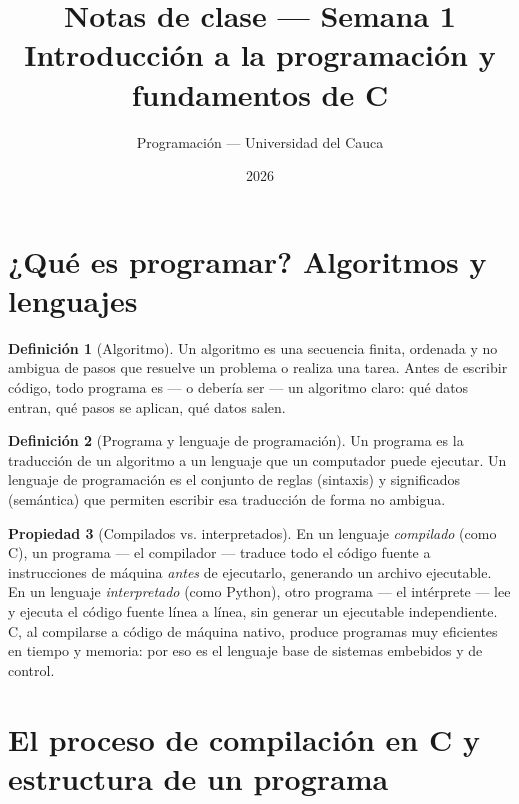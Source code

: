 \documentclass[11pt,letterpaper]{article}
\title{\textcolor{unicaucaverde}{\Large Notas de clase --- Semana 1}\\[4pt]
  \large Introducción a la programación y fundamentos de C}
\author{Programación --- Universidad del Cauca}
\date{2026}
\theoremstyle{definition}
\newtheorem{definicion}{Definición}[section]
\newtheorem{propiedad}[definicion]{Propiedad}
\begin{document}
\maketitle
\tableofcontents

\section{¿Qué es programar? Algoritmos y lenguajes}

\begin{definicion}[Algoritmo]
Un algoritmo es una secuencia finita, ordenada y no ambigua de pasos que resuelve un problema o
realiza una tarea. Antes de escribir código, todo programa es --- o debería ser --- un algoritmo
claro: qué datos entran, qué pasos se aplican, qué datos salen.
\end{definicion}

\begin{definicion}[Programa y lenguaje de programación]
Un programa es la traducción de un algoritmo a un lenguaje que un computador puede ejecutar. Un
lenguaje de programación es el conjunto de reglas (sintaxis) y significados (semántica) que
permiten escribir esa traducción de forma no ambigua.
\end{definicion}

\begin{propiedad}[Compilados vs. interpretados]
En un lenguaje \emph{compilado} (como C), un programa --- el compilador --- traduce todo el código
fuente a instrucciones de máquina \emph{antes} de ejecutarlo, generando un archivo ejecutable. En
un lenguaje \emph{interpretado} (como Python), otro programa --- el intérprete --- lee y ejecuta el
código fuente línea a línea, sin generar un ejecutable independiente. C, al compilarse a código de
máquina nativo, produce programas muy eficientes en tiempo y memoria: por eso es el lenguaje base de
sistemas embebidos y de control.
\end{propiedad}

\section{El proceso de compilación en C y estructura de un programa}
\end{document}
